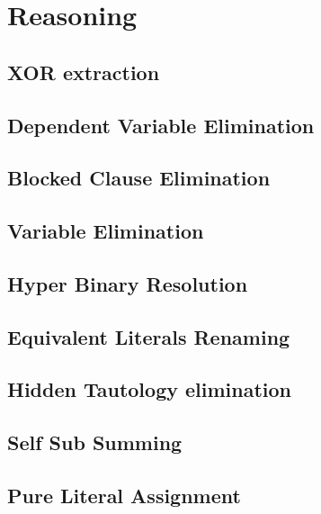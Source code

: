 \chapter{Reasoning}

\section{XOR extraction}

\section{Dependent Variable Elimination}

\section{Blocked Clause Elimination}

\section{Variable Elimination}

\section{Hyper Binary Resolution}

\section{Equivalent Literals Renaming}

\section{Hidden Tautology elimination}

\section{Self Sub Summing}

\section{Pure Literal Assignment}
